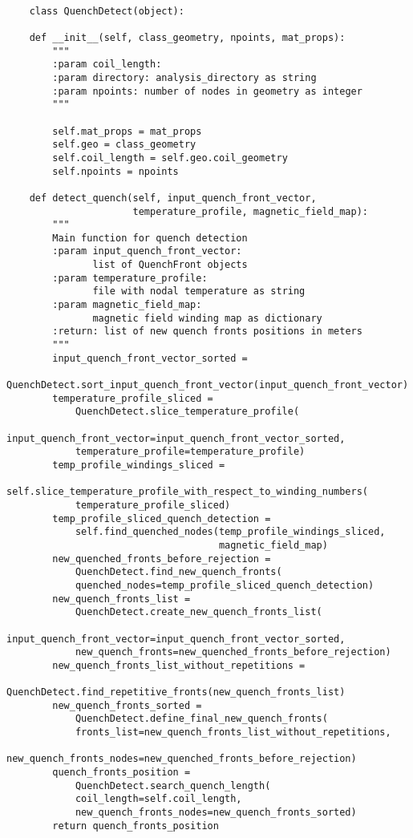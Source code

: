 
\begin{verbatim}
    
    class QuenchDetect(object):

    def __init__(self, class_geometry, npoints, mat_props):
        """
        :param coil_length:
        :param directory: analysis_directory as string
        :param npoints: number of nodes in geometry as integer
        """

        self.mat_props = mat_props
        self.geo = class_geometry
        self.coil_length = self.geo.coil_geometry
        self.npoints = npoints

    def detect_quench(self, input_quench_front_vector, 
                      temperature_profile, magnetic_field_map):
        """
        Main function for quench detection
        :param input_quench_front_vector: 
               list of QuenchFront objects
        :param temperature_profile: 
               file with nodal temperature as string
        :param magnetic_field_map: 
               magnetic field winding map as dictionary
        :return: list of new quench fronts positions in meters
        """
        input_quench_front_vector_sorted = 
            QuenchDetect.sort_input_quench_front_vector(input_quench_front_vector)
        temperature_profile_sliced = 
            QuenchDetect.slice_temperature_profile(
            input_quench_front_vector=input_quench_front_vector_sorted, 
            temperature_profile=temperature_profile)
        temp_profile_windings_sliced = 
            self.slice_temperature_profile_with_respect_to_winding_numbers(
            temperature_profile_sliced)
        temp_profile_sliced_quench_detection = 
            self.find_quenched_nodes(temp_profile_windings_sliced, 
                                     magnetic_field_map)
        new_quenched_fronts_before_rejection = 
            QuenchDetect.find_new_quench_fronts(
            quenched_nodes=temp_profile_sliced_quench_detection)
        new_quench_fronts_list = 
            QuenchDetect.create_new_quench_fronts_list(
            input_quench_front_vector=input_quench_front_vector_sorted, 
            new_quench_fronts=new_quenched_fronts_before_rejection)
        new_quench_fronts_list_without_repetitions = 
            QuenchDetect.find_repetitive_fronts(new_quench_fronts_list)
        new_quench_fronts_sorted = 
            QuenchDetect.define_final_new_quench_fronts(
            fronts_list=new_quench_fronts_list_without_repetitions, 
            new_quench_fronts_nodes=new_quenched_fronts_before_rejection)
        quench_fronts_position = 
            QuenchDetect.search_quench_length(
            coil_length=self.coil_length, 
            new_quench_fronts_nodes=new_quench_fronts_sorted)
        return quench_fronts_position


\end{verbatim}
